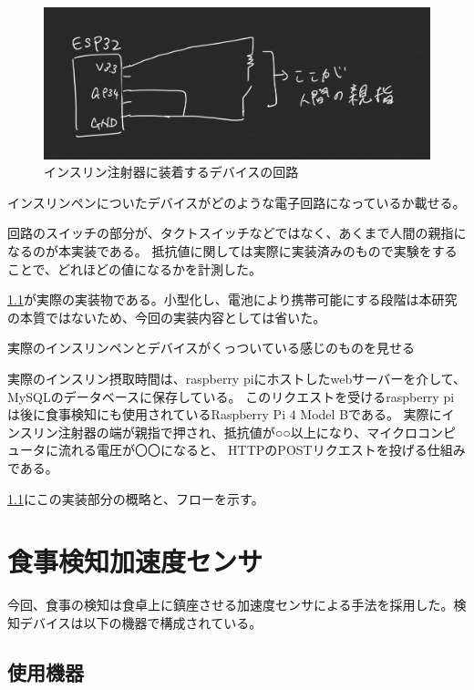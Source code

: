 \begin{figure}[htbp]
  \caption{インスリン注射器に装着するデバイスの回路}
  \label{fig:insulin_pen_device_circuit}
  \begin{center}
    \includegraphics[bb=0 0 1000 300,width=20cm]{assets/insulin_pen_device_circuit.png}
  \end{center}
\end{figure}


インスリンペンについたデバイスがどのような電子回路になっているか載せる。

回路のスイッチの部分が、タクトスイッチなどではなく、あくまで人間の親指になるのが本実装である。
抵抗値に関しては実際に実装済みのもので実験をすることで、どれほどの値になるかを計測した。

\ref{}が実際の実装物である。小型化し、電池により携帯可能にする段階は本研究の本質ではないため、今回の実装内容としては省いた。

実際のインスリンペンとデバイスがくっついている感じのものを見せる

実際のインスリン摂取時間は、raspberry piにホストしたwebサーバーを介して、MySQLのデータベースに保存している。
このリクエストを受けるraspberry piは後に食事検知にも使用されているRaspberry Pi 4 Model Bである。
実際にインスリン注射器の端が親指で押され、抵抗値が○○以上になり、マイクロコンピュータに流れる電圧が〇〇になると、
HTTPのPOSTリクエストを投げる仕組みである。

\ref{}にこの実装部分の概略と、フローを示す。

\section{食事検知加速度センサ}

今回、食事の検知は食卓上に鎮座させる加速度センサによる手法を採用した。検知デバイスは以下の機器で構成されている。

\subsection{使用機器}

